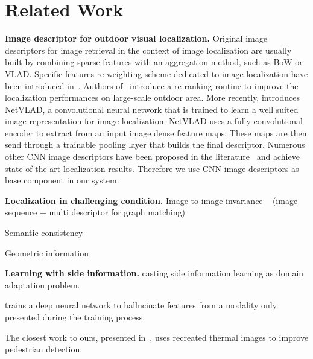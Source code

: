 \section{Related Work}
\label{sec:related_work}

\vspace{4pt}\noindent\textbf{Image descriptor for outdoor visual localization.} Original image descriptors for image retrieval in the context of image localization are usually built by combining sparse features with an aggregation method, such as BoW or VLAD. Specific features re-weighting scheme dedicated to image localization have been introduced in~\cite{Arandjelovic2014}. Authors of~\cite{Sattler2016} introduce a re-ranking routine to improve the localization performances on large-scale outdoor area. More recently, \cite{Arandjelovic2017} introduces NetVLAD, a convolutional neural network that is trained to learn a well suited image representation for image localization. NetVLAD uses a fully convolutional encoder to extract from an input image dense feature maps. These maps are then send through a trainable pooling layer that builds the final descriptor. Numerous other CNN image descriptors have been proposed in the literature~\cite{Kim2017a,Gordo2017,Radenovic2017,Sunderhauf2015a,Liu2018} and achieve state of the art localization results. Therefore we use CNN image descriptors as base component in our system.

\vspace{4pt}\noindent\textbf{Localization in challenging condition.} 
Image to image invariance  ~\cite{Naseer2018} (image sequence + multi descriptor for graph matching) ~\cite{Garg2018} ~\cite{Porav2018}

Semantic consistency ~\cite{Stenborg2018} ~\cite{Toft2018} ~\cite{Naseer2017a}

Geometric information ~\cite{Sattler2018} ~\cite{Torii2015} ~\cite{Schonberger2018} 

\vspace{4pt}\noindent\textbf{Learning with side information.} \cite{Li2018} casting side information learning as domain adaptation problem.

\cite{Hoffman2016} trains a deep neural network to hallucinate features from a modality only presented during the training process.
 
The closest work to ours, presented in~\cite{xu2017learning}, uses recreated thermal images to improve pedestrian detection.
